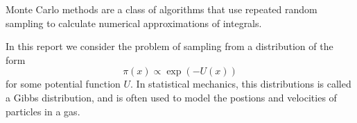 Monte Carlo methods are a class of algorithms that use repeated random sampling to calculate numerical approximations of integrals.

In this report we consider the problem of sampling from a distribution of the form
	$$
	\pi (x) \propto \exp(-U(x))
	$$
for some potential function $U$.  In statistical mechanics, this distributions is called a Gibbs distribution, and is often used to model the postions and velocities of particles in a gas. 



